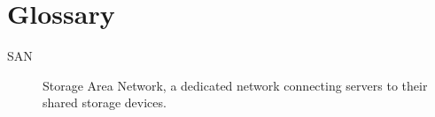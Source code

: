 \chapter*{Glossary}

\begin{description}
\item[SAN]
    Storage Area Network, a dedicated network connecting servers to their
    shared storage devices. \cite{ward2002}
\end{description}
